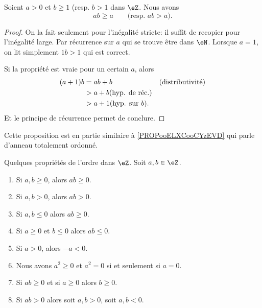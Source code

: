 \begin{lemma}       \label{LEMooSVDDooWsyxNP}
	Soient \( a>0\) et \( b \geq 1\) (resp. \( b > 1 \) dans \( \eZ\). Nous avons
	\begin{equation}
		ab \geq a \qquad \text{(resp. }ab>a\text{)}.
	\end{equation}
\end{lemma}

\begin{proof}
	On la fait seulement pour l'inégalité stricte: il suffit de recopier pour l'inégalité large. Par récurrence sur \( a \) qui se trouve être dans \( \eN \). Lorsque \( a = 1 \), on lit simplement \( 1b > 1 \) qui est correct.

	Si la propriété est vraie pour un certain \( a \), alors
	\begin{align}
		(a+1) b & = ab + b                          &  & \text{(distributivité)} \\
		        & > a + b\text{(hyp. de réc.)}                                   \\
		        & > a + 1\text{(hyp. sur \( b \)).}
	\end{align}
	Et le principe de récurrence permet de conclure.
\end{proof}

\begin{normaltext}	\label{NORMooLienRelatifsAnnTotOrdonne}
	Cette proposition est en partie similaire à \ref{PROPooELXCooCYzEVD} qui parle d'anneau totalement ordonné.
\end{normaltext}

\begin{proposition}	\label{PROPooYFUBooJUZgwH}
	Quelques propriétés de l'ordre dans \( \eZ\). Soit \( a, b \in \eZ\).
	\begin{enumerate}
		\item		\label{ITEMooULKWooLmKBse}
		      Si \( a,b\geq 0\), alors \( ab\geq 0\).
		\item	\label{ITEMooSAJPooEDSgXJ}
		      Si \( a,b>0\), alors \( ab>0\).
		\item		\label{ITEMooINGNooOgSGiF}
		      Si \( a,b\leq 0\) alors \( ab\geq 0\).
		\item	\label{ITEMooOGFXooDvLKAE}
		      Si \( a\geq 0\) et \( b\leq 0\) alors \( ab\leq 0\).
		\item	\label{ITEMooRelatifsOrdreOppose}
		      Si \( a>0\), alors \( -a<0\).
		\item	\label{ITEMooRelatifsOrdreCarrePositif}
		      Nous avons \( a^2\geq 0\) et \( a^2=0\) si et seulement si \( a=0\).
		\item		\label{ITEMooBUHIooLJOSLQ}
		      Si \( ab\geq 0\) et si \( a\geq 0\) alors \( b\geq 0\).
		\item		\label{ITEMooGDFPooBbpBgn}
		      Si \( ab>0\) alors soit \( a,b>0\), soit \( a,b<0\).
	\end{enumerate}
\end{proposition}

